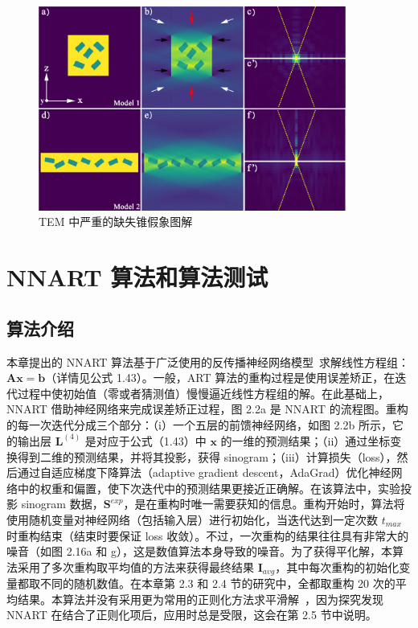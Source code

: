 \begin{figure}[htbp]
	\vspace{\baselineskip}
	\centering
	\includegraphics[width=0.9\textwidth]{../3.1/31}
	\caption{TEM 中严重的缺失锥假象图解}\label{fig:31}
	\song{}
\end{figure}

\section{NNART 算法和算法测试}
\subsection{算法介绍}

本章提出的 NNART 算法基于广泛使用的反传播神经网络模型~\cite{Rumelhart1986}求解线性方程组：$\boldsymbol{A}\boldsymbol{x}=\boldsymbol{b}$（详情见公式 1.43）。一般，ART 算法的重构过程是使用误差矫正，在迭代过程中使初始值（零或者猜测值）慢慢逼近线性方程组的解。在此基础上，NNART 借助神经网络来完成误差矫正过程，图 2.2a 是 NNART 的流程图。重构的每一次迭代分成三个部分：（i）一个五层的前馈神经网络，如图 2.2b 所示，它的输出层 $\boldsymbol{L}^{(4)}$ 是对应于公式（1.43）中 $\boldsymbol{x}$ 的一维的预测结果；（ii）通过坐标变换得到二维的预测结果，并将其投影，获得 sinogram；（iii）计算损失（loss），然后通过自适应梯度下降算法（adaptive  gradient descent，AdaGrad）优化神经网络中的权重和偏置，使下次迭代中的预测结果更接近正确解。在该算法中，实验投影 sinogram 数据，$\boldsymbol{S}^{exp}$，是在重构时唯一需要获知的信息。重构开始时，算法将使用随机变量对神经网络（包括输入层）进行初始化，当迭代达到一定次数 $t_{max}$ 时重构结束（结束时要保证 loss 收敛）。不过，一次重构的结果往往具有非常大的噪音（如图 2.16a 和 g），这是数值算法本身导致的噪音。为了获得平化解，本算法采用了多次重构取平均值的方法来获得最终结果 $\boldsymbol{I}_{avg}$，其中每次重构的初始化变量都取不同的随机数值。在本章第 2.3 和 2.4 节的研究中，全都取重构 20 次的平均结果。本算法并没有采用更为常用的正则化方法求平滑解~\cite{Aganj2007,Cichocki1995,Skoglund1996}，因为探究发现 NNART 在结合了正则化项后，应用时总是受限，这会在第 2.5 节中说明。

